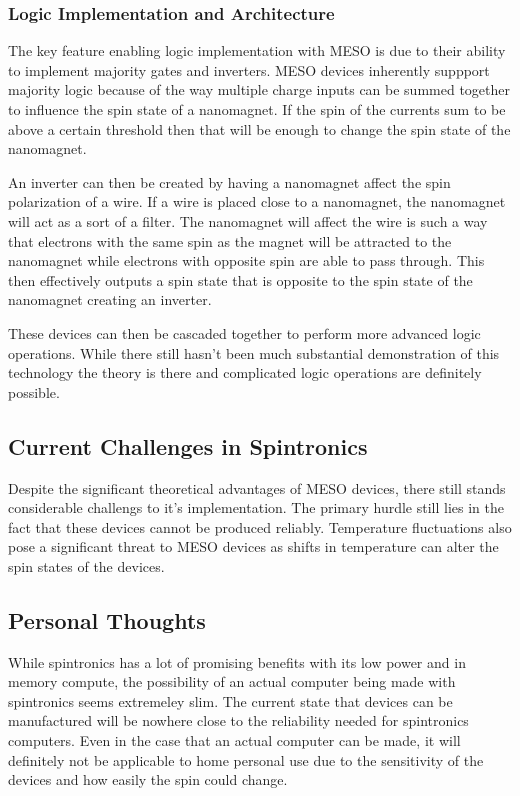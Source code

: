 \documentclass[sigconf]{acmart}
\begin{document}
\subsubsection{Logic Implementation and Architecture}
The key feature enabling logic implementation with MESO is due to 
their ability to implement majority gates and inverters. MESO devices
inherently suppport majority logic because of the way multiple 
charge inputs can be summed together to influence the spin state
of a nanomagnet. If the spin of the currents sum to be above a 
certain threshold then that will be enough to change the spin state
of the nanomagnet. 

An inverter can then be created by having a nanomagnet affect the 
spin polarization of a wire. If a wire is placed close to a nanomagnet, 
the nanomagnet will act as a sort of a filter. The nanomagnet 
will affect the wire is such a way that electrons with the same spin 
as the magnet will be attracted to the nanomagnet while electrons with 
opposite spin are able to pass through. This then effectively 
outputs a spin state that is opposite to the spin state of 
the nanomagnet creating an inverter. 

These devices can then be cascaded together to perform more advanced 
logic operations. While there still hasn't been much 
substantial demonstration of this technology the theory is there 
and complicated logic operations are definitely possible.
\cite{manipatruni2019scalable}

\subsection{Current Challenges in Spintronics}
Despite the significant theoretical advantages of MESO devices, there 
still stands considerable challengs to it's implementation. The primary 
hurdle still lies in the fact that these devices cannot be produced reliably. 
Temperature fluctuations also pose a significant threat to MESO devices
as shifts in temperature can alter the spin states of the devices. 

\subsection{Personal Thoughts}
While spintronics has a lot of promising benefits with its low power 
and in memory compute, the possibility of an actual computer being 
made with spintronics seems extremeley slim. The current state 
that devices can be manufactured will be nowhere close to the 
reliability needed for spintronics computers. Even in the case that 
an actual computer can be made, it will definitely not be applicable 
to home personal use due to the sensitivity of the devices and how easily 
the spin could change. 
\end{document}
